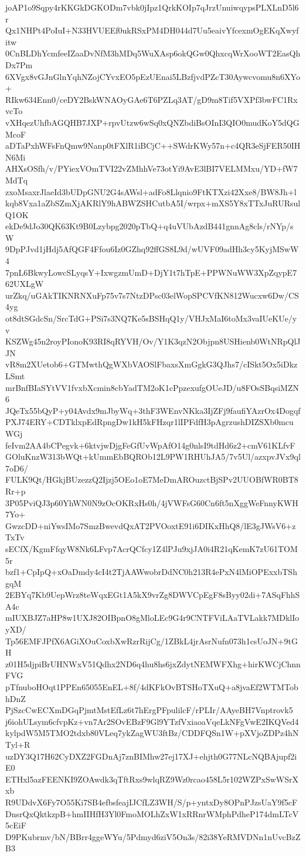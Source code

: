 joAP1o9Sqpy4rKKGkDGKODm7vbk0jIpz1QrkKOIp7qJrzUnuiwqypsPLXLnD5l6r
Qx1NHPt4PoIuI+N33HVUEEf0ukRSxPM4DH044d7Uu5eaivYfcexmOgEKqXwyfitw
0CnBLDhYcmfeeIZaaDvNfM3hMDq5WuXAsp6okQGw0QhxcqWrXooWT2EasQhDx7Pm
6XVgx8vGJnGlnYqhNZojCYvxEO5pEzUEnai5LBzfjvdPZcT30Aywcvomu8n6XYo+
RIkw634Enn0/ceDY2BskWNAOyGAe6T6PZLq3AT/gD9m8Tif5VXPf3bwFC1RxvcTo
vXHqezUhfbAGQHB7JXP+rpvUtzw6wSq0xQNZbdiBsOInI3QIO0mudKoY5dQGMcoF
aDTaPxhWFsFnQmw9Nanp0tFXlR1iBCjC++SWdrKWy57n+c4QR3eSjFER50IHN6Mi
AHXsOSfh/v/PYiexVOmTVI22vZMhhVe73otYi9AvE3lBI7VELMMxu/YD+fW7MdTq
zxoMsaxrJlaeId3bUDpGNU2G4sAWsl+adFo8Llqnio9FtKTXzi42Xxe8/BW8Jh+l
kqb8Vxa1aZbSZmXjAKRlY9hABWZSHCutbA5I/wrpx+mXS5Y8xTTxJuRURsulQ1OK
ekDe9dJo30QK63Kt9B0Lzybpg2020pTbQ+q4uVUbAzdB441gnnAg8cls/rNYp/sW
9DpPJvd1jHdj5AfQGF4Ffou6Iz0GZhq92ffGS8L9d/wUVF09adHh3cy5KyjMSwW4
7pnL6BkwyLowcSLyqsY+IxwgzmUmD+DjY1t7hTpE+PPWNuWW3XpZqypE762UXLgW
urZkq/uGAkTIKNRNXuFp75v7s7NtzDPsc03elWopSPCVfKN812Wucxw6Dw/CS4yg
ot8dtSGdcSn/SrcTdG+PSi7s3NQ7Ke5sBSHqQ1y/VHJxMaI6toMx3vaIUeKUe/yv
KSZWg45n2royPIonoK93RI8qRYVH/Ov/Y1K3qzN2Objpn8USHienb0WtNRpQlJJN
vR8m2XUetob6+GTMwthQgWXbVAOSlFbaxsXmGgkG3QJhs7/cISkt5Ox5iDkzLSmt
mrBnfBIaSYtVV1fvxbXcmin8cbYadTM2oK1cPpzexufgOUeJD/u8FOsSBqsiMZN6
JQeTx55bQyP+y04Avdx9mJbyWq+3thF3WEnvNKka3IjZFj9faufiYAzrOx4Dogqf
PXJ74ERY+CDTklxpEdRpngDw1kH5kFHzqr1lIPFdfH3pAgrzushDIZSXb0mcuWGj
feIvm2AA4bCPegvk+6ktvjwDjgFeGfUvWpAfO14g0nlsI9tdHd6z2+cmV61KLfvF
GOluKnzW313bWQt+kUmmEbBQROb12L9PW1RHUhJA5/7v5Ul/azxpvJVx9ql7oD6/
FULK9Qt/HGkjBUzezzQ2Ijzj5OEo1oE7MeDmAROuzctBjSPv2UUOBfWR0BT8Rr+p
3P05PviQJ3p60YhWN0N9zOcOKRxHs0h/4jVWFsG60Cn6ft5nXggWeFnnyKWH7Yo+
GwzcDD+niYwsIMo7SmzBwevdQxAT2PVOoxtE91i6DIKxHhQ8/lE3gJWsV6+zTxTv
sECfX/KgmFfqyW8Nk6LFvp7AcrQCfcy1Z4lPJu9xjJA0i4R21qKemK7zU61TOM5r
bzf1+CpIpQ+xOaDmdy4cI4t2TjAAWwobrDdNC0h213R4ePxN4lMiOPExxbTShgqM
2EBYq7Kb9UepWrz8teWqxEGt1A5kX9vrZg8DWVCpEgF8sByy02di+7ASqFhhSA4c
mIUXBJZ7aHP8w1UXJ82OIBpnO8gMloLEc9G4r9CNTFViLAaTVLakk7MDklIoyXD/
Tp56EMFJPfX6AGiXOuCoxbXwRzrRijCg/1ZBkL4jrAsrNufn073h1csUoJN+9tGH
z01H5djpiBrUHNWxV51Qdhx2ND6q4hu8hs6jxZdytNEMWFXhg+hirKWCjChnnFVG
pTfnuboHOqt1PPEn65055EnEL+8f/4dKFkOvBTSHoTXuQ+a8jvaEf2WTMTobhDnZ
PjSzcCwECXmDGqPjmtMstEfLz6t7hErgPFpulilcF/rPLIr/AAyeBH7Vnptrovk5
j6iohULsym6cfvpKz+vn7Ar2SOvEBzF9Gl9YTzfVxiaoaVqeLkNFgVwE2IKQVed4
kylpdW5M5TMO2tdxb80VLeq7ykZagWU3ftBz/CDDFQSn1W+pXVjoZDPz4hNTyl+R
uzDY3Q17H62CyDXZ2FGDnAj7znBIMhw27ej17XJ+ehjth0G77NLcNQBAjupf2iE0
ETHxl5azFEENKI9ZOAwdk3qTftRxs9wlqRZ9Wz0rcao458L5r102WZPxSwWSrXxb
R9UDdvX6Fy7O55Ki7SB4efbsfeajIJCfLZ3WH/S/p+yntxDy8OPnPJzsUaY9f5cF
DnsrQxQktkzpB+hmIIHfH3Yl0FmoMOLhZxW1xRRnrWMphPdheP174dmLTcV5cEiF
D9PKubrmv/bN/BBrr4ggeWYu/5Pdmyd6ziV5On3s/82i38YeRMVDNn1nUvcBzZB3
